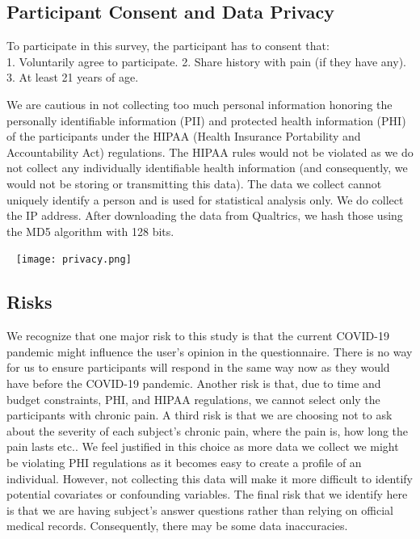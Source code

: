 \documentclass[
]{article}
\begin{document}
\hypertarget{participant-consent-and-data-privacy}{%
\subsection{Participant Consent and Data
Privacy}\label{participant-consent-and-data-privacy}}

To participate in this survey, the participant has to consent that:\\
1. Voluntarily agree to participate. 2. Share history with pain (if they
have any).\\
3. At least 21 years of age.

We are cautious in not collecting too much personal information honoring
the personally identifiable information (PII) and protected health
information (PHI) of the participants under the HIPAA (Health Insurance
Portability and Accountability Act) regulations. The HIPAA rules would
not be violated as we do not collect any individually identifiable
health information (and consequently, we would not be storing or
transmitting this data). The data we collect cannot uniquely identify a
person and is used for statistical analysis only. We do collect the IP
address. After downloading the data from Qualtrics, we hash those using
the MD5 algorithm with 128 bits.

~ \texttt{[image: privacy.png]}

\hypertarget{risks}{%
\subsection{Risks}\label{risks}}

We recognize that one major risk to this study is that the current
COVID-19 pandemic might influence the user's opinion in the
questionnaire. There is no way for us to ensure participants will
respond in the same way now as they would have before the COVID-19
pandemic. Another risk is that, due to time and budget constraints, PHI,
and HIPAA regulations, we cannot select only the participants with
chronic pain. A third risk is that we are choosing not to ask about the
severity of each subject's chronic pain, where the pain is, how long the
pain lasts etc.. We feel justified in this choice as more data we
collect we might be violating PHI regulations as it becomes easy to
create a profile of an individual. However, not collecting this data
will make it more difficult to identify potential covariates or
confounding variables. The final risk that we identify here is that we
are having subject's answer questions rather than relying on official
medical records. Consequently, there may be some data inaccuracies.
\end{document}
